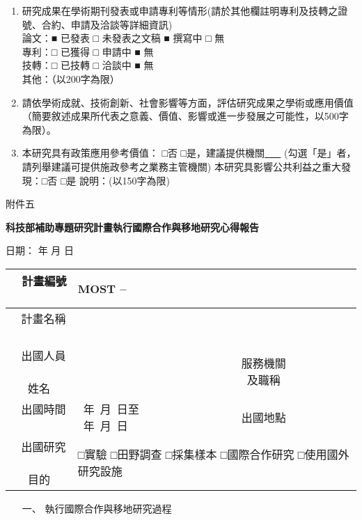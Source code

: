 \documentclass[12pt]{article}
\begin{document}
\begin{CJK}{UTF8}{}
\begin{enumerate}
\vspace{1cm}

\item 研究成果在學術期刊發表或申請專利等情形(請於其他欄註明專利及技轉之證號、合約、申請及洽談等詳細資訊) \\
論文：■ 已發表 □ 未發表之文稿 ■ 撰寫中 □ 無 \\
專利：□ 已獲得 □ 申請中 ■ 無 \\
技轉：□ 已技轉 □ 洽談中 ■ 無 \\
其他：（以200字為限） \\

\vspace{1cm}

\item 請依學術成就、技術創新、社會影響等方面，評估研究成果之學術或應用價值（簡要敘述成果所代表之意義、價值、影響或進一步發展之可能性，以500字為限）。

\vspace{1cm}
\item 本研究具有政策應用參考價值：  □否    □是，建議提供機關\underline{\, \, \, \,}  \newline
    (勾選「是」者，請列舉建議可提供施政參考之業務主管機關) \newline
   本研究具影響公共利益之重大發現：□否    □是  \newline
   說明：(以150字為限)

\end{enumerate}


\newpage
\vspace*{-1cm}
\noindent 附件五
\begin{center}
{\bf \Large 科技部補助專題研究計畫執行國際合作與移地研究心得報告}
\end{center}

\hfill{\small 日期：   年   月   日 }
\begin{table}[h!]{\renewcommand{\arraystretch}{2}
    \begin{tabular}{|c|l|c|l|}
    \hline
   ~ 計畫編號 ~ & \multicolumn{3}{l|}{MOST  --} \\ \hline
   ~ 計畫名稱 ~ & \multicolumn{3}{l|}{} \\ \hline
    \makecell{~ 出國人員 ~\\ 姓名} & ~ \hspace*{5cm} & \makecell{~ 服務機關 ~\\及職稱} & ~ \hspace*{5cm} \\ \hline
   ~ 出國時間 ~ & \makecell[l]{~年~月~日至\\  ~年~月~日} & 出國地點 & ~ \\ \hline
    \makecell{~ 出國研究 ~\\目的} & \multicolumn{3}{l|}{□實驗 □田野調查 □採集樣本 □國際合作研究 □使用國外研究設施} \\ \hline
    \end{tabular}
}
\end{table}
\begin{enumerate}
\item[一、] 執行國際合作與移地研究過程 


\end{enumerate}
\end{CJK}
\end{document}
